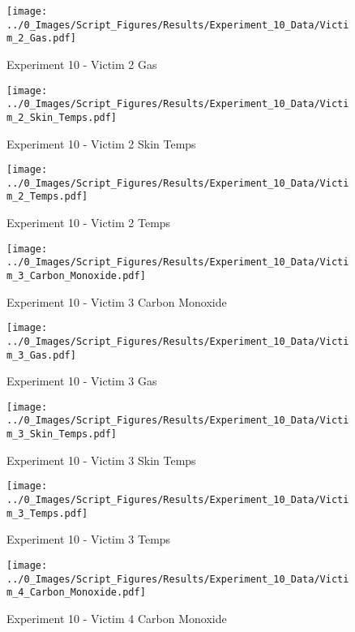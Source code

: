 	\begin{figure}[H]
		\centering
		\texttt{[image: ../0\_Images/Script\_Figures/Results/Experiment\_10\_Data/Victim\_2\_Gas.pdf]}
		\caption[]{Experiment 10 - Victim 2 Gas}
	\end{figure}
 
	\clearpage

	\begin{figure}[H]
		\centering
		\texttt{[image: ../0\_Images/Script\_Figures/Results/Experiment\_10\_Data/Victim\_2\_Skin\_Temps.pdf]}
		\caption[]{Experiment 10 - Victim 2 Skin Temps}
	\end{figure}
 

	\begin{figure}[H]
		\centering
		\texttt{[image: ../0\_Images/Script\_Figures/Results/Experiment\_10\_Data/Victim\_2\_Temps.pdf]}
		\caption[]{Experiment 10 - Victim 2 Temps}
	\end{figure}
 
	\clearpage

	\begin{figure}[H]
		\centering
		\texttt{[image: ../0\_Images/Script\_Figures/Results/Experiment\_10\_Data/Victim\_3\_Carbon\_Monoxide.pdf]}
		\caption[]{Experiment 10 - Victim 3 Carbon Monoxide}
	\end{figure}
 

	\begin{figure}[H]
		\centering
		\texttt{[image: ../0\_Images/Script\_Figures/Results/Experiment\_10\_Data/Victim\_3\_Gas.pdf]}
		\caption[]{Experiment 10 - Victim 3 Gas}
	\end{figure}
 
	\clearpage

	\begin{figure}[H]
		\centering
		\texttt{[image: ../0\_Images/Script\_Figures/Results/Experiment\_10\_Data/Victim\_3\_Skin\_Temps.pdf]}
		\caption[]{Experiment 10 - Victim 3 Skin Temps}
	\end{figure}
 

	\begin{figure}[H]
		\centering
		\texttt{[image: ../0\_Images/Script\_Figures/Results/Experiment\_10\_Data/Victim\_3\_Temps.pdf]}
		\caption[]{Experiment 10 - Victim 3 Temps}
	\end{figure}
 
	\clearpage

	\begin{figure}[H]
		\centering
		\texttt{[image: ../0\_Images/Script\_Figures/Results/Experiment\_10\_Data/Victim\_4\_Carbon\_Monoxide.pdf]}
		\caption[]{Experiment 10 - Victim 4 Carbon Monoxide}
	\end{figure}
 

